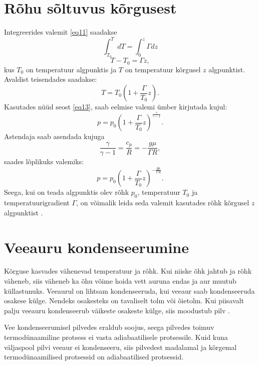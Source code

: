 \documentclass{trkut}%
\begin{document}
\section{Rõhu sõltuvus kõrgusest}
Integreerides valemit \ref{eq11} saadakse
\begin{equation}
\int_{T_0}^{T} dT = \int_{0}^{z} \Gamma dz
\end{equation}
\begin{equation}
T-T_0 = \Gamma z,
\end{equation}
kus $T_0$ on temperatuur algpunktis ja $T$ on temperatuur kõrgusel $z$ algpunktist. Avaldist teisendades saadakse:
\begin{equation}
T = T_0 \left(1+\frac{\Gamma}{T_0}z\right).
\end{equation}
Kasutades nüüd seost \ref{eq13}, saab eelmise valemi ümber kirjutada kujul:
\begin{equation}
p=p_0 \left(1+\frac{\Gamma}{T_0}z\right)^{\frac{\gamma}{\gamma-1}}.
\end{equation}
Astendaja saab asendada kujuga
\begin{equation}
\frac{\gamma}{\gamma-1} = \frac{c_p}{R} = -\frac{g\mu}{\Gamma R},
\end{equation}
saades lõplikuks valemiks:
\begin{equation}\label{eq15}
p=p_0 \left(1+\frac{\Gamma}{T_0}z\right)^{ -\frac{g\mu}{\Gamma R}}.
\end{equation}
Seega, kui on teada algpunktis olev rõhk $p_0$, temperatuur $T_0$ ja temperatuurigradient $\Gamma$, on võimalik leida seda valemit kasutades rõhk kõrgusel $z$ algpunktist \parencite{Texas}.



\section{Veeauru kondenseerumine}
Kõrguse kasvades vähenevad temperatuur ja rõhk. Kui niiske õhk jahtub ja rõhk väheneb, siis väheneb ka õhu võime hoida vett auruna endas ja aur muutub küllastunuks. Veeaurul on lihtsam kondenseeruda, kui veeaur saab kondenseeruda osakese külge. Nendeks osakesteks on tavaliselt tolm või õietolm. Kui piisavalt palju veeauru kondenseerub väikeste osakeste külge, siis moodustub pilv \parencite[209]{raamat1}.

Vee kondenseerumisel pilvedes eraldub soojus, seega pilvedes toimuv termodünaamiline protsess ei vasta adiabaatilisele protsessile. Kuid kuna väljaspool pilvi veeaur ei kondenseeru, siis pilvedest madalamal ja kõrgemal termodünaamilised protsessid on adiabaatilised protsessid.
\end{document}
